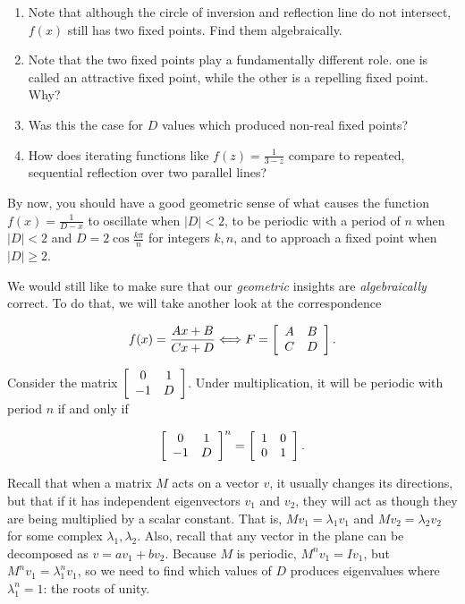 \documentclass[../gatm.tex]{subfiles}
\begin{document}
\begin{enumerate}
\begin{enumerate}
\item Note that although the circle of inversion and reflection line do not intersect, $f(x)$ still has two fixed points. Find them algebraically.
\item Note that the two fixed points play a fundamentally different role. one is called an attractive fixed point, while the other is a repelling fixed point. Why?
\item Was this the case for $D$ values which produced non-real fixed points?
\item How does iterating functions like $f(z)=\frac{1}{3-z}$ compare to repeated, sequential reflection over two parallel lines?
\end{enumerate}
\setcounter{problem_i}{\value{enumi}}
\end{enumerate}
By now, you should have a good geometric sense of what causes the function $f(x)=\frac{1}{D-x}$ to oscillate when $|D|<2$, to be periodic with a period of $n$ when $|D|<2$ and $D=2\cos \frac{k\pi}{n}$ for integers $k,n$, and to approach a fixed point when $|D|\geq 2$.

We would still like to make sure that our \textit{geometric} insights are \textit{algebraically} correct. To do that, we will take another look at the correspondence


$$f(x)=\frac{Ax+B}{Cx+D}\Longleftrightarrow F=\left[\begin{array}{cc} A & B \\ C & D \end{array}\right].$$

Consider the matrix $\left[\begin{array}{cc} 0 & 1 \\ -1 & D \end{array}\right]$. Under multiplication, it will be periodic with period $n$ if and only if

$$\left[\begin{array}{cc} 0 & 1 \\ -1 & D \end{array}\right]^n=\left[\begin{array}{cc} 1 & 0 \\ 0 & 1 \end{array}\right].$$

Recall that when a matrix $M$ acts on a vector $v$, it usually changes its directions, but that if it has independent eigenvectors $v_1$ and $v_2$, they will act as though they are being multiplied by a scalar constant. That is, $Mv_1=\lambda_1 v_1$ and $Mv_2=\lambda_2 v_2$ for some complex $\lambda_1,\lambda_2$. Also, recall that any vector in the plane can be decomposed as $v=av_1+bv_2$. Because $M$ is periodic, $M^nv_1=Iv_1$, but $M^nv_1=\lambda_1^n v_1$, so we need to find which values of $D$ produces eigenvalues where $\lambda_1^n=1$: the roots of unity.
\end{document}
